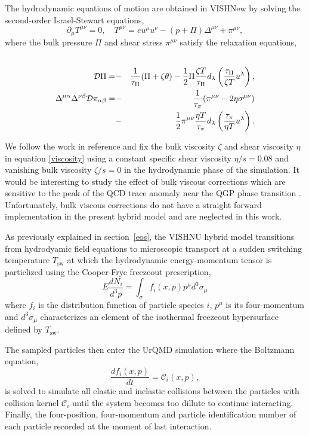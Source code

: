 \documentclass[aps,prc,reprint,amsmath,nofootinbib,superscriptaddress]{revtex4-1}
\begin{document}
The hydrodynamic equations of motion are obtained in VISHNew by solving the second-order Israel-Stewart equations,
\begin{equation}
 \partial_\mu T^{\mu\nu} = 0, \quad T^{\mu\nu} = e u^\mu u^\nu - (p + \Pi) \Delta^{\mu\nu} + \pi^{\mu\nu},
\end{equation}
where the bulk pressure $\Pi$ and shear stress $\pi^{\mu\nu}$ satisfy the relaxation equations,
\begin{eqnarray}
 \label{viscosity}
 \cr \mathcal{D}\Pi = &-&\frac{1}{\tau_\Pi}(\Pi + \zeta \theta) - \frac{1}{2} \Pi \frac{\zeta T}{\tau_\Pi}d_\lambda \left(\frac{\tau_\Pi}{\zeta T} u^\lambda \right), \nonumber \\
  \Delta^{\mu\alpha} \Delta^{\nu\beta} \mathcal{D}\pi_{\alpha\beta} = &-&\frac{1}{\tau_\pi}(\pi^{\mu\nu} - 2 \eta \sigma^{\mu\nu}) \\
  &-& \frac{1}{2} \pi^{\mu\nu} \frac{\eta T}{\tau_\pi} d_\lambda\left(\frac{\tau_\pi}{\eta T} u^\lambda \right ).
\end{eqnarray}

We follow the work in reference \cite{?} and fix the bulk viscosity $\zeta$ and shear viscosity $\eta$ in equation \eqref{viscosity} using a constant specific shear viscosity $\eta/s=0.08$ 
and vanishing bulk viscosity $\zeta/s=0$ in the hydrodynamic phase of the simulation. It would be interesting to study the effect of bulk viscous corrections which are sensitive to 
the peak of the QCD trace anomaly near the QGP phase transition \cite{?}. Unfortunately, bulk viscous corrections do not have a straight forward implementation in the present hybrid model 
and are neglected in this work. 

As previously explained in section \,\ref{eos}, the VISHNU hybrid model transitions from hydrodyamic field equations to microscopic transport at a sudden switching temperature $T_\text{sw}$ 
at which the hydrodynamic energy-momentum tensor is particlized using the Cooper-Frye freezeout prescription,
\begin{equation}
 E\frac{dN_i}{d^3p} = \int_\sigma f_i(x,p) p^\mu d^3\sigma_\mu
 \label{cooper-frye}
\end{equation}
where $f_i$ is the distribution function of particle species $i$, $p^\mu$ is its four-momentum and $d^3\sigma_\mu$ characterizes an element of the isothermal freezeout 
hypersurface defined by $T_\text{sw}$.

The sampled particles then enter the UrQMD simulation where the Boltzmann equation, 
\begin{equation}
 \frac{df_i(x,p)}{dt} = \mathcal{C}_i(x,p),
\end{equation}
is solved to simulate all elastic and inelastic collisions between the particles with collision kernel $\mathcal{C}_i$ until the system becomes too dillute to continue interacting. 
Finally, the four-position, four-momentum and particle identification number of each particle recorded at the moment of last interaction. 
 
\end{document}
